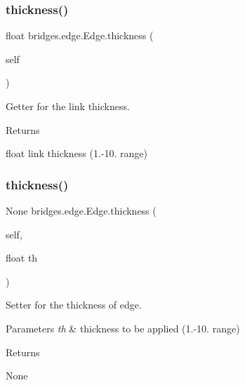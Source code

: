\subsubsection{\texorpdfstring{thickness()}{thickness()}\hspace{0.1cm}{\footnotesize\ttfamily [1/2]}}
{\footnotesize\ttfamily  float bridges.\+edge.\+Edge.\+thickness (\begin{DoxyParamCaption}\item[{}]{self }\end{DoxyParamCaption})}



Getter for the link thickness. 

\begin{DoxyReturn}{Returns}


float link thickness (1.-\/10. range) 
\end{DoxyReturn}
\mbox{\label{classbridges_1_1edge_1_1_edge_a8a73c1e0606642be6cf0317e020eb49a}} 
\subsubsection{\texorpdfstring{thickness()}{thickness()}\hspace{0.1cm}{\footnotesize\ttfamily [2/2]}}
{\footnotesize\ttfamily  None bridges.\+edge.\+Edge.\+thickness (\begin{DoxyParamCaption}\item[{}]{self,  }\item[{float}]{th }\end{DoxyParamCaption})}



Setter for the thickness of edge. 


\begin{DoxyParams}{Parameters}
{\em th} & thickness to be applied (1.-\/10. range) \\
\hline
\end{DoxyParams}
\begin{DoxyReturn}{Returns}


None 
\end{DoxyReturn}
\mbox{\label{classbridges_1_1edge_1_1_edge_a70e81381eaa6abafd0c40962326351a9}} 
